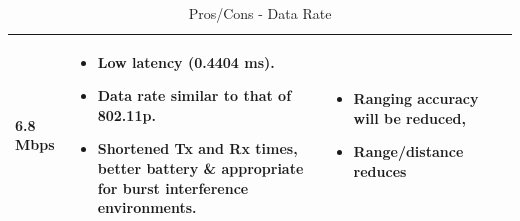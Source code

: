 \begin{enumerate}
\begin{table}
\begin{longtable}{| p{2.55cm}  | p{4.8cm} | p{5cm} | p{5cm} |}
           6.8 Mbps                     & \vspace{-7mm} \begin{itemize}[leftmargin=*] \item Low latency (0.4404 ms). \item Data rate similar to that of 802.11p. \item Shortened Tx and Rx times, better battery \& appropriate for burst interference environments.\end{itemize} & \vspace{-7mm} \begin{itemize}[leftmargin=*] \item Ranging accuracy will be reduced, \item Range/distance reduces\end{itemize}                        \\ \hline
       \end{longtable}
       \caption{Pros/Cons - Data Rate}
       \label{table:prosconsdatarate}
   \end{table}
    

\end{enumerate}
